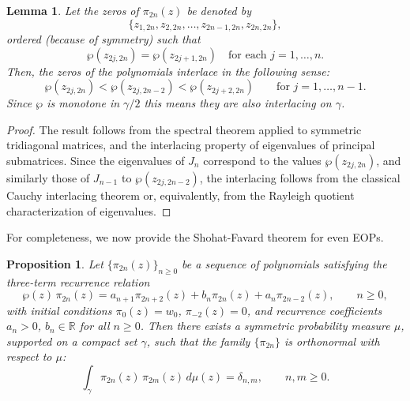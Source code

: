 \documentclass[11pt,a4paper]{article}
\newtheorem{lemma}[theorem]{Lemma}
\newtheorem{proposition}[theorem]{Proposition}
\theoremstyle{definition}
\numberwithin{equation}{section}
\numberwithin{theorem}{section}
\newcommand{\myrmk}[2]{\begin{quote}\fbox{\begin{minipage}{\linewidth}\small \noindent{\color{red}\bf #2:} #1{\color{red}}\end{minipage}}\end{quote}}
\newcommand{\rmkH}[1]{\myrmk{#1}{HD}}
\newcommand{\rmkS}[1]{\myrmk{#1}{SL}}
\begin{document}
\begin{lemma}
Let the zeros of \( \pi_{2n}(z) \) be denoted by
\[
\{z_{1,2n}, z_{2,2n}, \dots, z_{2n-1,2n}, z_{2n,2n}\},
\]
ordered (because of symmetry) such that
\[
\wp(z_{2j,2n}) = \wp(z_{2j+1,2n}) \quad \text{for each } j = 1, \dots, n.
\]
Then, the zeros of the polynomials interlace in the following sense:
\begin{equation}
    \wp(z_{2j,2n}) < \wp(z_{2j,2n-2}) < \wp(z_{2j+2,2n}) \qquad \text{for } j = 1, \dots, n-1.
\end{equation}
Since $\wp$ is monotone in $\gamma/2$ this means they are also interlacing on $\gamma$.
\end{lemma}

\begin{proof}
The result follows from the spectral theorem applied to symmetric tridiagonal matrices, and the interlacing property of eigenvalues of principal submatrices. Since the eigenvalues of \( J_n \) correspond to the values \( \wp(z_{2j,2n}) \), and similarly those of \( J_{n-1} \) to \( \wp(z_{2j,2n-2}) \), the interlacing follows from the classical Cauchy interlacing theorem or, equivalently, from the Rayleigh quotient characterization of eigenvalues.
\end{proof}

For completeness, we now provide the Shohat-Favard theorem for even EOPs. 
\begin{proposition}
    Let \( \{\pi_{2n}(z)\}_{n \geq 0} \) be a sequence of polynomials satisfying the three-term recurrence relation
\begin{equation}\label{eq:3term_recurrence}
    \wp(z)\, \pi_{2n}(z) = a_{n+1} \pi_{2n+2}(z) + b_n \pi_{2n}(z) + a_n \pi_{2n-2}(z), \qquad n \geq 0,
\end{equation}
with initial conditions \( \pi_0(z) = w_0 \), \( \pi_{-2}(z) = 0 \), and recurrence coefficients \( a_n > 0 \), \( b_n \in \mathbb{R} \) for all \( n \geq 0 \). Then there exists a symmetric probability measure \( \mu \), supported on a compact set \( \gamma \), such that the family \( \{ \pi_{2n} \} \) is orthonormal with respect to \( \mu \):
\begin{equation}
    \int_\gamma \pi_{2n}(z)\, \pi_{2m}(z) \, d\mu(z) = \delta_{n,m}, \qquad n, m \geq 0.
\end{equation}
\end{proposition}
\end{document}
